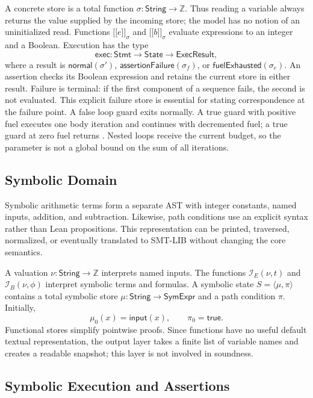 \documentclass[10pt,twocolumn]{article}
\newcommand{\code}[1]{\texttt{\detokenize{#1}}}
\newcommand{\llbracket}{\mathopen{[\![}}
\newcommand{\rrbracket}{\mathclose{]\!]}}
\begin{document}
A concrete store is a total function
$\sigma : \mathsf{String}\rightarrow\mathbb{Z}$.  Thus reading a variable always
returns the value supplied by the incoming store; the model has no notion of an
uninitialized read.  Functions $\llbracket e\rrbracket_\sigma$ and
$\llbracket b\rrbracket_\sigma$ evaluate expressions to an integer and a Boolean.
Execution has the type
\[
 \mathsf{exec}:\mathsf{Stmt}\rightarrow\mathsf{State}
                  \rightarrow\mathsf{ExecResult},
\]
where a result is $\mathsf{normal}(\sigma')$,
$\mathsf{assertionFailure}(\sigma_f)$, or
$\mathsf{fuelExhausted}(\sigma_e)$.  An assertion checks its Boolean
expression and retains the current store in either result.  Failure is terminal:
if the first component of a sequence fails, the second is not evaluated.  This
explicit failure store is essential for stating correspondence at the failure
point.  A false loop guard exits normally.  A true guard with positive fuel
executes one body iteration and continues with decremented fuel; a true guard at
zero fuel returns \code{fuelExhausted}.  Nested loops receive the current budget,
so the parameter is not a global bound on the sum of all iterations.

\subsection{Symbolic Domain}

Symbolic arithmetic terms form a separate AST with integer constants, named
inputs, addition, and subtraction.  Likewise, path conditions use an explicit
\code{SymBool} syntax rather than Lean propositions.  This representation can be
printed, traversed, normalized, or eventually translated to SMT-LIB without
changing the core semantics.

A valuation $\nu:\mathsf{String}\rightarrow\mathbb{Z}$ interprets named inputs.
The functions $\mathcal I_E(\nu,t)$ and $\mathcal I_B(\nu,\phi)$ interpret
symbolic terms and formulas.  A symbolic state
$S=\langle\mu,\pi\rangle$ contains a total symbolic store
$\mu:\mathsf{String}\rightarrow\mathsf{SymExpr}$ and a path condition $\pi$.
Initially,
\[
  \mu_0(x)=\mathsf{input}(x), \qquad \pi_0=\mathsf{true}.
\]
Functional stores simplify pointwise proofs.  Since functions have no useful
default textual representation, the output layer takes a finite list of variable
names and creates a readable snapshot; this layer is not involved in soundness.

\subsection{Symbolic Execution and Assertions}
\end{document}
